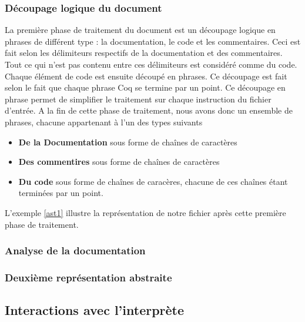 \documentclass[a4paper, 11pt]{report}
\begin{document}
    \subsubsection{Découpage logique du document}
    La première phase de traitement du document est un découpage logique
    en phrases de différent type : la documentation, le code et les
    commentaires.
    Ceci est fait selon les délimiteurs respectifs de la documentation et
    des commentaires. Tout ce qui n'est pas contenu entre ces délimiteurs
    est considéré comme du code.
    Chaque élément de code est ensuite découpé en phrases. Ce découpage est
    fait selon le fait que chaque phrase Coq se termine par un point. Ce
    découpage en phrase permet de simplifier le traitement sur chaque
    instruction du fichier d'entrée.
    A la fin de cette phase de traitement, nous avons donc un ensemble
    de phrases, chacune appartenant à l'un des types suivants
    \begin{itemize}
      \item \textbf{De la Documentation} sous forme de chaînes de caractères
      \item \textbf{Des commentires} sous forme de chaînes de caractères
      \item \textbf{Du code} sous forme de chaînes de caracères, chacune
        de ces chaînes étant terminées par un point.
    \end{itemize}

    L'exemple \cref{ast1} illustre la représentation de notre fichier après
    cette première phase de traitement.
    \subsubsection{Analyse de la documentation}
    \subsubsection{Deuxième représentation abstraite}

    \subsection{Interactions avec l'interprète}
\end{document}
